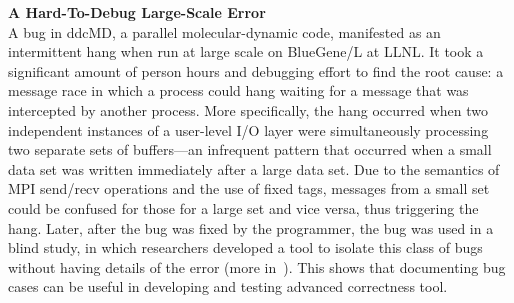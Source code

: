 \begin{WrapText}
\footnotesize
{\large \textbf{A Hard-To-Debug Large-Scale Error}}\\
A bug in ddcMD, a parallel molecular-dynamic code, manifested as an
intermittent hang when run at large scale on BlueGene/L at LLNL.
It took a significant amount of person hours and debugging effort 
to find the root cause: a message race in which a process could 
hang waiting for a message that was intercepted by 
another process. More specifically, the hang occurred when 
two independent instances of a user-level I/O layer
were simultaneously processing two separate sets of buffers---an infrequent pattern that occurred when a small data set 
was written immediately after a large data set. Due to the 
semantics of MPI send/recv operations and the use of fixed tags, 
messages from a small set could be confused for those for a 
large set and vice versa, thus triggering the hang. 
Later, after the bug was fixed by the programmer, the bug was 
used in a blind study, in which researchers developed a tool 
to isolate this class of bugs without having details of the error 
(more in~\cite{PACTLaguna:2012}). This shows that documenting 
bug cases can be useful in developing and testing advanced 
correctness tool.
\end{WrapText}

